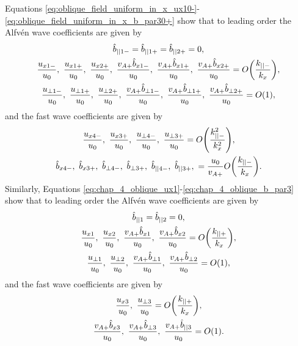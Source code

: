 Equations \eqref{eq:oblique_field_uniform_in_x_ux10-}-\eqref{eq:oblique_field_uniform_in_x_b_par30+} show that to leading order the Alfv\'en wave coefficients are given by
\begin{gather}
    \label{eq:piecewise_alfven_wave_asymptotic_expansion_1}
    \hat{b}_{||1-} = \hat{b}_{||1+} = \hat{b}_{||2+} = 0, \\
    \frac{u_{x1-}}{u_0},\ \frac{u_{x1+}}{u_0},\ \frac{u_{x2+}}{u_0},\ \frac{v_{A+}\hat{b}_{x1-}}{u_0},\ \frac{v_{A+}\hat{b}_{x1+}}{u_0},\ \frac{v_{A+}\hat{b}_{x2+}}{u_0} = O\qty(\frac{k_{||-}}{k_x}), \\
    \frac{u_{\perp1-}}{u_0},\ \frac{u_{\perp1+}}{u_0},\ \frac{u_{\perp2+}}{u_0},\ \frac{v_{A+}\hat{b}_{\perp1-}}{u_0},\ \frac{v_{A+}\hat{b}_{\perp1+}}{u_0},\ \frac{v_{A+}\hat{b}_{\perp2+}}{u_0} = O(1), \\
\end{gather}
and the fast wave coefficients are given by 
\begin{gather}
    \frac{u_{x4-}}{u_0},\ \frac{u_{x3+}}{u_0},\ \frac{u_{\perp4-}}{u_0},\ \frac{u_{\perp3+}}{u_0} = O\qty(\frac{k_{||-}^2}{k_x^2}), \\
    \label{eq:piecewise_fast_wave_asymptotic_expansion_2}
    \hat{b}_{x4-},\  \hat{b}_{x3+},\  \hat{b}_{\perp 4-},\  \hat{b}_{\perp3+},\  \hat{b}_{||4-},\  \hat{b}_{||3+},\ = \frac{u_0}{v_{A+}}O\qty(\frac{k_{||-}}{k_x}).
\end{gather}
Similarly, Equations \eqref{eq:chap_4_oblique_ux1}-\eqref{eq:chap_4_oblique_b_par3} show that to leading order 
the Alfv\'en wave coefficients are given by
\begin{gather}
    \label{eq:uniform_alfven_wave_asymptotic_expansion_1}
    \hat{b}_{||1} = \hat{b}_{||2} = 0, \\
    \frac{u_{x1}}{u_0},\ \frac{u_{x2}}{u_0},\ \frac{v_{A+}\hat{b}_{x1}}{u_0},\ \frac{v_{A+}\hat{b}_{x2}}{u_0} = O\qty(\frac{k_{||+}}{k_x}), \\
    \frac{u_{\perp1}}{u_0},\ \frac{u_{\perp 2}}{u_0},\ \frac{v_{A+}\hat{b}_{\perp1}}{u_0},\ \frac{v_{A+}\hat{b}_{\perp2}}{u_0} = O(1),
\end{gather}
and the fast wave coefficients are given by
\begin{gather}
    \frac{u_{x3}}{u_0},\ \frac{u_{\perp 3}}{u_0} = O\qty(\frac{k_{||+}}{k_x}), \\
    \label{eq:uniform_fast_wave_asymptotic_expansion_2}
    \frac{v_{A+}\hat{b}_{x3}}{u_0},\ \frac{v_{A+}\hat{b}_{\perp3}}{u_0},\ \frac{v_{A+}\hat{b}_{||3}}{u_0} = O(1).
\end{gather}
